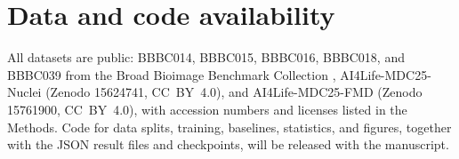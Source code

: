 \documentclass[10pt]{article}
\begin{document}
\section*{Data and code availability}
All datasets are public: BBBC014, BBBC015, BBBC016, BBBC018, and BBBC039 from
the Broad Bioimage Benchmark Collection \cite{ljosa2012bbbc}, AI4Life-MDC25-Nuclei
\cite{ai4life_mdc25_2025} (Zenodo 15624741, CC~BY~4.0), and AI4Life-MDC25-FMD
\cite{ai4life_mdc25_fmd_2025} (Zenodo 15761900, CC~BY~4.0), with accession
numbers and licenses listed in the Methods. Code for data splits, training, baselines,
statistics, and figures, together with the JSON result files and checkpoints,
will be released with the manuscript.

\begingroup
\small


\endgroup
\end{document}
